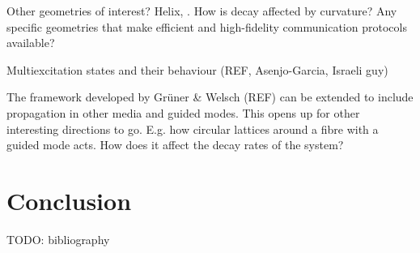 \documentclass{article}
\begin{document}
Other geometries of interest? Helix, . How is decay affected by curvature?
Any specific geometries that make efficient and high-fidelity communication protocols available?

Multiexcitation states and their behaviour (REF, Asenjo-Garcia, Israeli guy)

The framework developed by Grüner \& Welsch (REF) can be extended to include propagation in other media and guided modes. This opens up for other interesting directions to go. E.g. how circular lattices around a fibre with a guided mode acts. How does it affect the decay rates of the system? 

\section{Conclusion}

\newpage
TODO: bibliography
\end{document}
